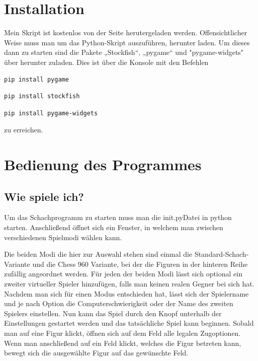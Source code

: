 \documentclass[a4paper, 10pt]{scrartcl}
\begin{document}
\section{Installation}
Mein Skript ist kostenlos von der Seite \href{https://github.com/Aetherion-dot/Chess_Python}{\color{blue}{github}} herutergeladen werden.
Offensichtlicher Weise muss man um das Python-Skript auszuführen, \href{https://www.python.org/downloads/}{\color{blue}{python3}} herunter laden. 
Um dieses dann zu starten sind die Pakete „Stockfish“, „pygame“ und "pygame-widgets" über \href{https://pypi.org/project/pip/}{\color{blue}{pip}} herunter zuladen.
Dies ist über die Konsole mit den Befehlen
\begin{lstlisting}[language=bash]
        pip install pygame
\end{lstlisting}
\begin{lstlisting}[language=bash]
        pip install stockfish
\end{lstlisting}
\begin{lstlisting}[language=bash]
        pip install pygame-widgets
\end{lstlisting}
zu erreichen.

\section{Bedienung des Programmes}
\subsection{Wie spiele ich?}
Um das Schachprogramm zu starten muss man die \glqq init.py\grqq Datei in python starten. Anschließend öffnet sich ein Fenster, in welchem man zwischen verschiedenen Spielmodi
wählen kann.

\begin{figure}
        \centering
\end{figure}

Die beiden Modi die hier zur Auswahl stehen sind einmal die Standard-Schach-Variante und die Chess 960 Variante, bei der die Figuren in der hinteren Reihe
zufällig angeordnet werden.
Für jeden der beiden Modi lässt sich optional ein zweiter virtueller Spieler hinzufügen, falls man keinen realen Gegner bei sich hat.
Nachdem man sich für einen Modus entschieden hat, lässt sich der Spielername und je nach Option die Computerschwierigkeit oder der Name des zweiten Spielers einstellen.
Nun kann das Spiel durch den Knopf unterhalb der Einstellungen gestartet werden und das tatsächliche Spiel kann beginnen.
Sobald man auf eine Figur klickt, öffnen sich auf dem Feld alle legalen Zugoptionen. Wenn man anschließend auf ein Feld klickt, welches die Figur betreten kann, bewegt
sich die ausgewählte Figur auf das gewünschte Feld.
\end{document}
